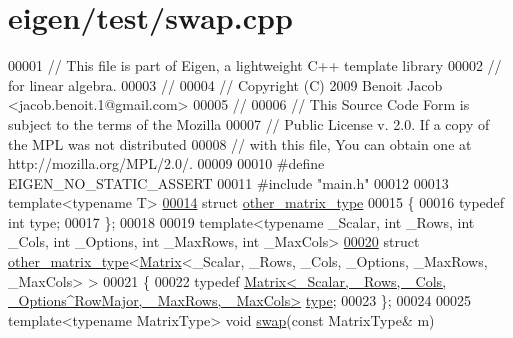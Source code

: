 \hypertarget{eigen_2test_2swap_8cpp_source}{}\section{eigen/test/swap.cpp}
\label{eigen_2test_2swap_8cpp_source}

\begin{DoxyCode}
00001 \textcolor{comment}{// This file is part of Eigen, a lightweight C++ template library}
00002 \textcolor{comment}{// for linear algebra.}
00003 \textcolor{comment}{//}
00004 \textcolor{comment}{// Copyright (C) 2009 Benoit Jacob <jacob.benoit.1@gmail.com>}
00005 \textcolor{comment}{//}
00006 \textcolor{comment}{// This Source Code Form is subject to the terms of the Mozilla}
00007 \textcolor{comment}{// Public License v. 2.0. If a copy of the MPL was not distributed}
00008 \textcolor{comment}{// with this file, You can obtain one at http://mozilla.org/MPL/2.0/.}
00009 
00010 \textcolor{preprocessor}{#define EIGEN\_NO\_STATIC\_ASSERT}
00011 \textcolor{preprocessor}{#include "main.h"}
00012 
00013 \textcolor{keyword}{template}<\textcolor{keyword}{typename} T>
\hyperlink{structother__matrix__type}{00014} \textcolor{keyword}{struct }\hyperlink{structother__matrix__type}{other\_matrix\_type}
00015 \{
00016   \textcolor{keyword}{typedef} \textcolor{keywordtype}{int} type;
00017 \};
00018 
00019 \textcolor{keyword}{template}<\textcolor{keyword}{typename} \_Scalar, \textcolor{keywordtype}{int} \_Rows, \textcolor{keywordtype}{int} \_Cols, \textcolor{keywordtype}{int} \_Options, \textcolor{keywordtype}{int} \_MaxRows, \textcolor{keywordtype}{int} \_MaxCols>
\hyperlink{structother__matrix__type_3_01_matrix_3_01___scalar_00_01___rows_00_01___cols_00_01___options_00a4667fe800cd3729955b287c1d8a9c85}{00020} \textcolor{keyword}{struct }\hyperlink{structother__matrix__type}{other\_matrix\_type}<\hyperlink{group___core___module_class_eigen_1_1_matrix}{Matrix}<\_Scalar, \_Rows, \_Cols, \_Options, \_MaxRows, \_MaxCols>
       >
00021 \{
00022   \textcolor{keyword}{typedef} \hyperlink{group___core___module_class_eigen_1_1_matrix}{Matrix<\_Scalar, \_Rows, \_Cols, \_Options^RowMajor, \_MaxRows, \_MaxCols>}
       \hyperlink{group___core___module_class_eigen_1_1_matrix}{type};
00023 \};
00024 
00025 \textcolor{keyword}{template}<\textcolor{keyword}{typename} MatrixType> \textcolor{keywordtype}{void} \hyperlink{endian_8c_a3ca5ecd34b04d6a243c054ac3a57f68d}{swap}(\textcolor{keyword}{const} MatrixType& m)

\end{DoxyCode}
